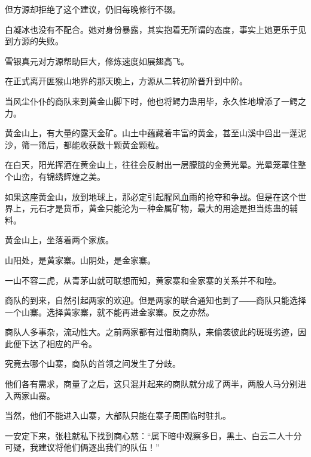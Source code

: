 \begin{this_body}
但方源却拒绝了这个建议，仍旧每晚修行不辍。

白凝冰也没有不配合。她对身份暴露，其实抱着无所谓的态度，事实上她更乐于见到方源的失败。

雪银真元对方源帮助巨大，修炼速度如展翅高飞。

在正式离开匪猴山地界的那天晚上，方源从二转初阶晋升到中阶。

当风尘仆仆的商队来到黄金山脚下时，他也将鳄力蛊用毕，永久性地增添了一鳄之力。

黄金山上，有大量的露天金矿。山土中蕴藏着丰富的黄金，甚至山溪中舀出一蓬泥沙，筛一筛后，都能收获数十颗黄金颗粒。

在白天，阳光挥洒在黄金山上，往往会反射出一层朦胧的金黄光晕。光晕笼罩住整个山峦，有锦绣辉煌之美。

如果这座黄金山，放到地球上，那必定引起腥风血雨的抢夺和争战。但是在这个世界上，元石才是货币，黄金只能沦为一种金属矿物，最大的用途是担当炼蛊的辅料。

黄金山上，坐落着两个家族。

山阳处，是黄家寨。山阴处，是金家寨。

一山不容二虎，从青茅山就可联想而知，黄家寨和金家寨的关系并不和睦。

商队的到来，自然引起两家的欢迎。但是两家的联合通知也到了――商队只能选择一个山寨。选择黄家寨，就不能再进金家寨。反之亦然。

商队人多事杂，流动性大。之前两家都有过借助商队，来偷袭彼此的斑斑劣迹，因此便下达了相应的严令。

究竟去哪个山寨，商队的首领之间发生了分歧。

他们各有需求，商量了之后，这只混并起来的商队就分成了两半，两股人马分别进入两家山寨。

当然，他们不能进入山寨，大部队只能在寨子周围临时驻扎。

一安定下来，张柱就私下找到商心慈：“属下暗中观察多日，黑土、白云二人十分可疑，我建议将他们俩逐出我们的队伍！”

\end{this_body}

